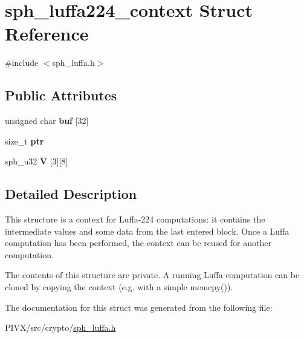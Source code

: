 \hypertarget{structsph__luffa224__context}{}\section{sph\+\_\+luffa224\+\_\+context Struct Reference}
\label{structsph__luffa224__context}


{\ttfamily \#include $<$sph\+\_\+luffa.\+h$>$}

\subsection*{Public Attributes}
\begin{DoxyCompactItemize}
\item 
\mbox{\label{structsph__luffa224__context_ad6cc353326e629ce48de2486870ff0b6}} 
unsigned char {\bfseries buf} \mbox{[}32\mbox{]}
\item 
\mbox{\label{structsph__luffa224__context_a9b262de3994c59a1cbea33de785355c8}} 
size\+\_\+t {\bfseries ptr}
\item 
\mbox{\label{structsph__luffa224__context_ad2adb6333eb0d783338dcf17866d91dd}} 
sph\+\_\+u32 {\bfseries V} \mbox{[}3\mbox{]}\mbox{[}8\mbox{]}
\end{DoxyCompactItemize}


\subsection{Detailed Description}
This structure is a context for Luffa-\/224 computations\+: it contains the intermediate values and some data from the last entered block. Once a Luffa computation has been performed, the context can be reused for another computation.

The contents of this structure are private. A running Luffa computation can be cloned by copying the context (e.\+g. with a simple {\ttfamily memcpy()}). 

The documentation for this struct was generated from the following file\+:\begin{DoxyCompactItemize}
\item 
P\+I\+V\+X/src/crypto/\mbox{\hyperlink{sph__luffa_8h}{sph\+\_\+luffa.\+h}}\end{DoxyCompactItemize}
